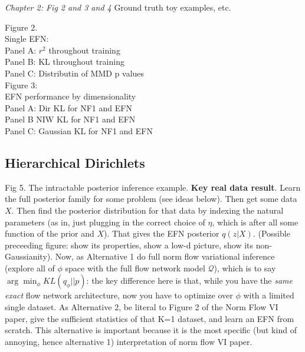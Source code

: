 \documentclass{article}
\begin{document}
 \emph{Chapter 2: Fig 2 and 3 and 4}
 Ground truth toy examples, etc. 
 
Figure 2. \\
Single EFN: \\
Panel A:  $r^2$ throughout training \\
Panel B: KL throughout training \\ 
Panel C: Distributin of MMD p values \\


Figure 3: \\
EFN performance by dimensionality \\
Panel A: Dir KL for NF1 and EFN \\
Panel B NIW KL for NF1 and EFN \\
Panel C: Gaussian KL for NF1 and EFN \\


\subsection{Hierarchical Dirichlets}

Fig 5.  The intractable posterior inference example.  {\bf Key real data result}.  Learn the full posterior family for some problem (see ideas below).  Then get some data $X$.  Then find the posterior distribution for that data by indexing the natural parameters (as in, just plugging in the correct choice of $\eta$, which is after all some function of the prior and $X$).  That gives the EFN posterior  $q(z | X)$.  (Possible preceeding figure: show its properties, show a low-d picture, show its non-Gaussianity).  
Now, as Alternative 1 do full norm flow variational inference (explore all of $\phi$ space with the full flow network model $\mathcal{Q}$), which is to say $\arg\min_\phi KL(q_\phi || p)$: the key difference here is that, while you have the \emph{same exact} flow network architecture, now you have to optimize over $\phi$ with a limited single dataset.   As Alternative 2, be literal to Figure 2 of the Norm Flow VI paper, give the sufficient statistics of that K=1 dataset, and learn an EFN from scratch.  This alternative is important because it is the most specific (but kind of annoying, hence alternative 1) interpretation of norm flow VI paper.  
\end{document}
